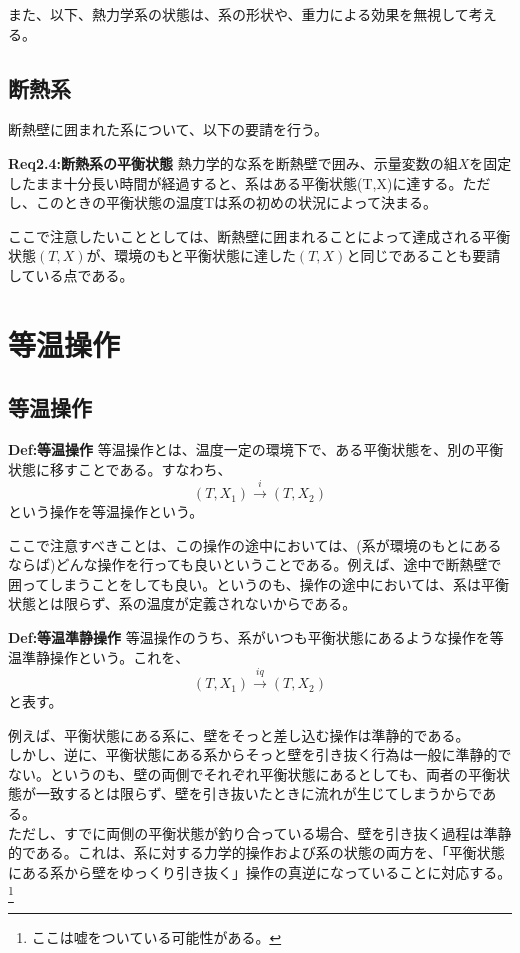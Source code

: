 \documentclass[a4paper,11pt]{jsarticle}
\begin{document}
また、以下、熱力学系の状態は、系の形状や、重力による効果を無視して考える。\\

\subsection{断熱系}
断熱壁に囲まれた系について、以下の要請を行う。
\begin{itembox}[l]{\textbf{Req2.4:断熱系の平衡状態}}
    熱力学的な系を断熱壁で囲み、示量変数の組$X$を固定したまま十分長い時間が経過すると、系はある平衡状態(T,X)に達する。ただし、このときの平衡状態の温度Tは系の初めの状況によって決まる。
\end{itembox}
ここで注意したいこととしては、断熱壁に囲まれることによって達成される平衡状態$(T,X)$が、環境のもと平衡状態に達した$(T,X)$と同じであることも要請している点である。\\

\section{等温操作}
\subsection{等温操作}

\begin{itembox}[l]{\textbf{Def:等温操作}}
    等温操作とは、温度一定の環境下で、ある平衡状態を、別の平衡状態に移すことである。すなわち、
    \begin{equation}
        (T,X_1) \xrightarrow{i} (T,X_2)
    \end{equation}
    という操作を等温操作という。
\end{itembox}
ここで注意すべきことは、この操作の途中においては、(系が環境のもとにあるならば)どんな操作を行っても良いということである。例えば、途中で断熱壁で囲ってしまうことをしても良い。というのも、操作の途中においては、系は平衡状態とは限らず、系の温度が定義されないからである。\\

\begin{itembox}[l]{\textbf{Def:等温準静操作}}
    等温操作のうち、系がいつも平衡状態にあるような操作を等温準静操作という。これを、
    \begin{equation}
        (T,X_1) \xrightarrow{iq} (T,X_2)
    \end{equation}
    と表す。
\end{itembox}
例えば、平衡状態にある系に、壁をそっと差し込む操作は準静的である。\\
しかし、逆に、平衡状態にある系からそっと壁を引き抜く行為は一般に準静的でない。というのも、壁の両側でそれぞれ平衡状態にあるとしても、両者の平衡状態が一致するとは限らず、壁を引き抜いたときに流れが生じてしまうからである。\\
ただし、すでに両側の平衡状態が釣り合っている場合、壁を引き抜く過程は準静的である。これは、系に対する力学的操作および系の状態の両方を、「平衡状態にある系から壁をゆっくり引き抜く」操作の真逆になっていることに対応する。\footnote{ここは嘘をついている可能性がある。}\\
\end{document}
